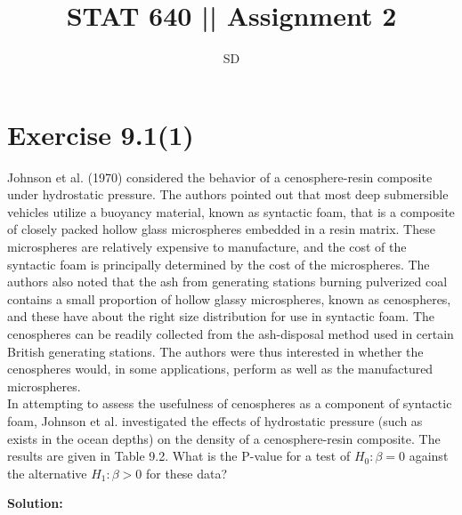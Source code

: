 \documentclass[a4paper]{article}\usepackage[]{graphicx}\usepackage[]{color}
\begin{document}
\title{STAT 640 || Assignment 2}
\author{SD }
\maketitle

\section{ Exercise 9.1(1)}

Johnson et al. (1970) considered the behavior of a cenosphere-resin composite under
hydrostatic pressure. The authors pointed out that most deep submersible vehicles utilize a
buoyancy material, known as syntactic foam, that is a composite of closely packed hollow
glass microspheres embedded in a resin matrix. These microspheres are relatively expensive
to manufacture, and the cost of the syntactic foam is principally determined by the cost of the microspheres. The authors also noted that the ash from generating stations burning pulverized coal contains a small proportion of hollow glassy microspheres, known as cenospheres, and these have about the right size distribution for use in syntactic foam. The cenospheres can be readily collected from the ash-disposal method used in certain British generating stations. The authors were thus interested in whether the cenospheres would, in some applications, perform as well as the manufactured microspheres.\\
In attempting to assess the usefulness of cenospheres as a component of syntactic foam,
Johnson et al. investigated the effects of hydrostatic pressure (such as exists in the ocean
depths) on the density of a cenosphere-resin composite. The results are given in Table 9.2.
What is the P-value for a test of $H_0: \beta= 0$ against the alternative $H_1: \beta > 0$ for these data?\\

\vspace{2 mm}

\raggedright{\textbf{Solution:}}\\
\end{document}
